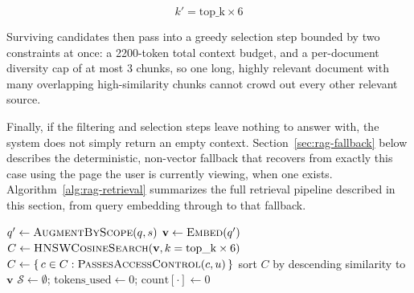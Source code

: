 \begin{equation}
  k' = \text{top\_k} \times 6
  \label{eq:overfetch}
\end{equation}

Surviving candidates then pass into a greedy selection step bounded by two constraints at once: a 2200-token total context budget, and a per-document diversity cap of at most 3 chunks, so one long, highly relevant document with many overlapping high-similarity chunks cannot crowd out every other relevant source.

Finally, if the filtering and selection steps leave nothing to answer with, the system does not simply return an empty context. Section~\ref{sec:rag-fallback} below describes the deterministic, non-vector fallback that recovers from exactly this case using the page the user is currently viewing, when one exists. Algorithm~\ref{alg:rag-retrieval} summarizes the full retrieval pipeline described in this section, from query embedding through to that fallback.

\begin{algorithm}[htbp]
  \small
  \DontPrintSemicolon
  $q' \leftarrow \textsc{AugmentByScope}(q, s)$\;
  $\mathbf{v} \leftarrow \textsc{Embed}(q')$ 
  $C \leftarrow \textsc{HNSWCosineSearch}(\mathbf{v}, k = \text{top\_k} \times 6)$ 
  $C \leftarrow \{\, c \in C : \textsc{PassesAccessControl}(c, u) \,\}$ 
  sort $C$ by descending similarity to $\mathbf{v}$\;
  $\mathcal{S} \leftarrow \emptyset$; $\text{tokens\_used} \leftarrow 0$; $\text{count}[\cdot] \leftarrow 0$\;
  \caption{RAG passage retrieval}
  \label{alg:rag-retrieval}
\end{algorithm}

